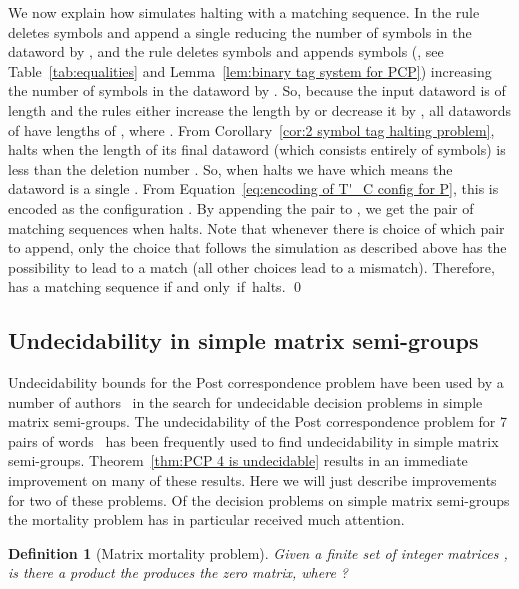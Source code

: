 \documentclass[11pt]{article} \usepackage{amsfonts,amsmath,amssymb,amsthm}
\renewenvironment{proof}{{\bfseries\noindent Proof.}}{\qed\vspace{3.5ex}}
\newtheorem{definition}{Definition}
\begin{document}
\begin{proof}
We now explain how  simulates  halting with a matching sequence. In  the rule  deletes  symbols and append a single  reducing the number of symbols in the dataword by , and the rule  deletes  symbols and appends  symbols (, see Table~\ref{tab:equalities} and Lemma~\ref{lem:binary tag system for PCP}) increasing the number of symbols in the dataword by .
So, because the input dataword  is of length  and the rules either increase the length by  or decrease it by , all datawords of  have lengths of , where . 
From Corollary~\ref{cor:2 symbol tag halting problem},  halts when the length of its final dataword (which consists entirely of  symbols) is less than the deletion number . 
So, when  halts we have  which means the dataword is a single . 
From Equation~\eqref{eq:encoding of T'_C config for P}, this is encoded as the configuration . 
By appending the pair  to , we get the pair of matching sequences  when  halts. 
Note that whenever there is choice of which pair to append, only the choice that follows the simulation as described above has the possibility to lead to a match (all other choices lead to a mismatch). 
Therefore,  has a matching sequence if and \mbox{only if  halts.}
\end{proof}

\subsection{Undecidability in simple matrix semi-groups}
Undecidability bounds for the Post correspondence problem have been used by a number of authors~\cite{Bell2008,Blondel1997,Bournez2002,Cassaigne1998,Halava2001,Halava2007,Halava2007A,Paterson1970} in the search for undecidable decision problems in simple matrix semi-groups. The undecidability of the Post correspondence problem for 7 pairs of words~\cite{Matiyasevich2005}
has been frequently used to find undecidability in simple matrix semi-groups. Theorem~\ref{thm:PCP 4 is undecidable} results in an immediate improvement on many of these results. Here we will just describe improvements for two of these problems. Of the decision problems on simple matrix semi-groups the mortality problem has in particular received much attention. 

\begin{definition}[Matrix mortality problem]
Given a finite set of  integer matrices  , is there a product the produces the zero matrix, where ? 
\end{definition}
\end{document}
